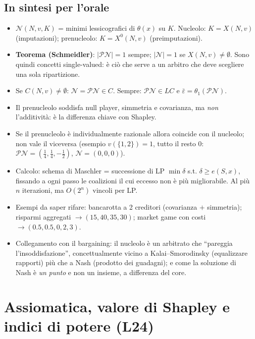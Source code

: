 \documentclass[12pt,a4paper,twoside]{book}
\theoremstyle{plain}
\theoremstyle{definition}
\begin{document}
\section*{In sintesi per l'orale}
\begin{itemize}
  \item $\mathcal{N}(N,v,K)$ = minimi lessicografici di $\theta(x)$ su $K$.
        Nucleolo: $K=X(N,v)$ (imputazioni); prenucleolo: $K=X^{0}(N,v)$
        (preimputazioni).
  \item \textbf{Teorema (Schmeidler)}: $|\mathcal{PN}|=1$ sempre; $|\mathcal{N}|=1$
        se $X(N,v)\ne\emptyset$. Sono quindi concetti single-valued: è ciò che
        serve a un arbitro che deve scegliere una sola ripartizione.
  \item Se $C(N,v)\ne\emptyset$: $\mathcal{N}=\mathcal{PN}\in C$. Sempre:
        $\mathcal{PN}\in LC$ e $\bar\varepsilon=\theta_1(\mathcal{PN})$.
  \item Il prenucleolo soddisfa null player, simmetria e covarianza, ma
        \emph{non} l'additività: è la differenza chiave con Shapley.
  \item Se il prenucleolo è individualmente razionale allora coincide con il
        nucleolo; non vale il viceversa (esempio $v(\{1,2\})=1$, tutto il resto
        $0$: $\mathcal{PN}=(\tfrac14,\tfrac14,-\tfrac12)$, $\mathcal{N}=(0,0,0)$).
  \item Calcolo: schema di Maschler = successione di LP $\min\delta$ s.t.
        $\delta\ge e(S,x)$, fissando a ogni passo le coalizioni il cui eccesso non
        è più migliorabile. Al più $n$ iterazioni, ma $O(2^n)$ vincoli per LP.
  \item Esempi da saper rifare: bancarotta a 2 creditori (covarianza $+$
        simmetria); risparmi aggregati
        $\to(15,40,35,30)$; market game con costi $\to(0.5,0.5,0,2,3)$.
  \item Collegamento con il bargaining: il nucleolo è un arbitrato che
        ``pareggia l'insoddisfazione'', concettualmente vicino a Kalai--Smorodinsky
        (equalizzare rapporti) più che a Nash (prodotto dei guadagni); e come la
        soluzione di Nash è \emph{un punto} e non un insieme, a differenza del
        core.
\end{itemize}

\chapter{Assiomatica, valore di Shapley e indici di potere (L24)}
\label{ch:shapley}
\end{document}
